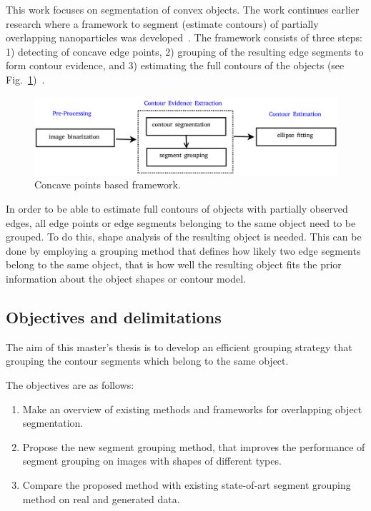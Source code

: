 \documentclass{lutmscthesis}[2010/09/22]
\begin{document}
This work focuses on segmentation of convex objects. The work continues earlier research where a framework to segment (estimate contours) of partially overlapping nanoparticles was developed~\cite{zafari2017comparison}. The framework consists of three steps: 
1) detecting of concave edge points, 
2) grouping of the resulting edge segments to form contour evidence, and 3) estimating the full contours of the objects (see Fig.~\ref{fig:concave_framework})~\cite{Zafari15,zafari-bb}.

\begin{figure}[ht]
  \includegraphics[width=\linewidth]{concave-framework.png}
  \caption{Concave points based framework.~\cite{zafari-bb}}
  \label{fig:concave_framework}
\end{figure}

In order to be able to estimate full contours of objects with partially observed edges, all edge points or edge segments belonging to the same object need to be grouped. To do this, shape analysis of the resulting object is needed. This can be done by employing a grouping method that defines how likely two edge segments belong to the same object, that is how well the resulting object fits the prior information about the object shapes or contour model. 


\subsection{Objectives and delimitations}
\label{sec:objectives}

The aim of this master’s thesis is to develop an efficient grouping strategy that grouping the contour segments which belong to the same object.

The objectives are as follows:
\begin{enumerate}
\item Make an overview of existing methods and frameworks for overlapping object segmentation.
\item Propose the new segment grouping method, that improves the performance of segment grouping on images with shapes of different types.
\item Compare the proposed method with existing state-of-art segment grouping method on real and generated data.
\end{enumerate}
\end{document}
